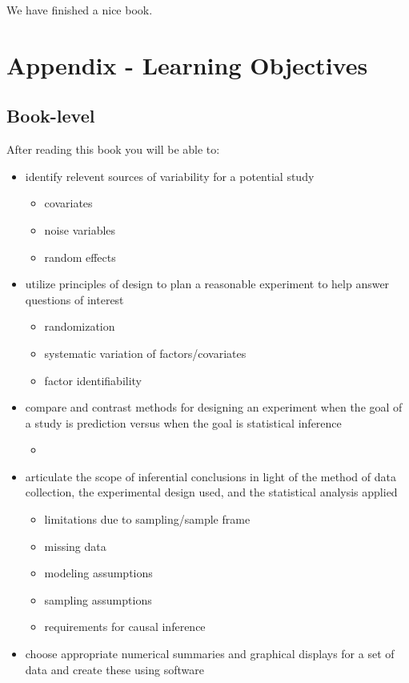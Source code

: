 \documentclass[]{book}
\providecommand{\tightlist}{%
  \setlength{\itemsep}{0pt}\setlength{\parskip}{0pt}}
\begin{document}
We have finished a nice book.

\hypertarget{learningobj}{%
\chapter{Appendix - Learning Objectives}\label{learningobj}}

\hypertarget{book-level}{%
\section{Book-level}\label{book-level}}

After reading this book you will be able to:

\begin{itemize}
\tightlist
\item
  identify relevent sources of variability for a potential study

  \begin{itemize}
  \tightlist
  \item
    covariates
  \item
    noise variables
  \item
    random effects
  \end{itemize}
\item
  utilize principles of design to plan a reasonable experiment to help answer questions of interest

  \begin{itemize}
  \tightlist
  \item
    randomization
  \item
    systematic variation of factors/covariates
  \item
    factor identifiability
  \end{itemize}
\item
  compare and contrast methods for designing an experiment when the goal of a study is prediction versus when the goal is statistical inference

  \begin{itemize}
  \item
  \end{itemize}
\item
  articulate the scope of inferential conclusions in light of the method of data collection, the experimental design used, and the statistical analysis applied

  \begin{itemize}
  \tightlist
  \item
    limitations due to sampling/sample frame
  \item
    missing data
  \item
    modeling assumptions
  \item
    sampling assumptions
  \item
    requirements for causal inference
  \end{itemize}
\item
  choose appropriate numerical summaries and graphical displays for a set of data and create these using software


\end{itemize}
\end{document}
